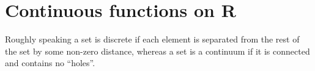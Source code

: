 \chapter{Continuous functions on R}\label{ch 9}

\begin{note}
    Roughly speaking a set is discrete if each element is separated from the rest of the set by some non-zero distance, whereas a set is a continuum if it is connected and contains no ``holes''.
\end{note}